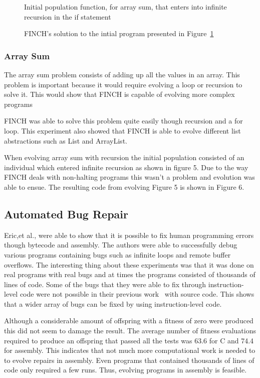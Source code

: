 \documentclass{sig-alternate}
\begin{document}
\begin{figure}
\centering
{}
\caption{Initial population function, for array sum, that enters into infinite recursion in the if statement}
\label{initial rec}
\end{figure}

\begin{figure}
\centering
{}
\caption{FINCH's solution to the intial program presented in Figure~\ref{initial rec}}
\end{figure}

\subsubsection{Array Sum}
The array sum problem consists of adding up all the values in an array. This problem is important because it would require evolving a loop or recursion to solve it. This would show that FINCH is capable of evolving more complex programs\par
FINCH was able to solve this problem quite easily though recursion and a for loop. This experiment also showed that FINCH is able to evolve different list abstractions such as List and ArrayList.

When evolving array sum with recursion the initial population consisted of an individual which entered infinite recursion as shown in figure 5. Due to the way FINCH deals with non-halting programs this wasn't a problem and evolution was able to ensue. The resulting code from evolving Figure 5 is shown in Figure 6.


\subsection{Automated Bug Repair}

Eric,et al., were able to show that it is possible to fix human programming errors though bytecode and assembly. The authors were able to successfully debug various programs containing bugs such as infinite loops and remote buffer overflows. The interesting thing about these experiments was that it was done on real programs with real bugs and at times the programs consisted of thousands of lines of code. Some of the bugs that they were able to fix through instruction-level code were not possible in their previous work~\cite{Forrest:2009} with source code. This shows that a wider array of bugs can be fixed by using instruction-level code.

Although a considerable amount of offspring with a fitness of zero were produced this did not seem to damage the result. The average number of fitness evaluations required to produce an offspring that passed all the tests was 63.6 for C and 74.4 for assembly. This indicates that not much more computational work is needed to to evolve repairs in assembly. Even programs that contained thousands of lines of code only required a few runs. Thus, evolving programs in assembly is feasible.
 
\end{document}
